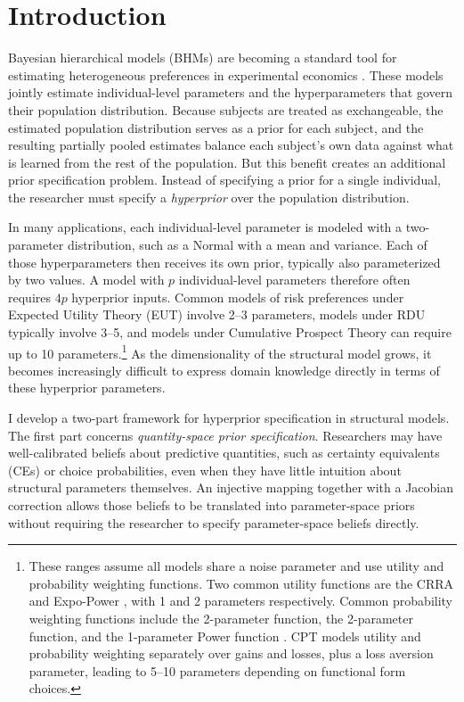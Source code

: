 \documentclass[12pt,a4paper]{article}
\theoremstyle{definition}
\theoremstyle{remark}
\begin{document}
\section{Introduction}
\label{sec:introduction}

Bayesian hierarchical models (BHMs) are becoming a standard tool for estimating heterogeneous preferences in
experimental economics \parencite{Gao2022,Nilsson2011}. These models jointly
estimate individual-level parameters and the hyperparameters that govern their
population distribution. Because subjects are treated as exchangeable, the
estimated population distribution serves as a prior for each subject, and the
resulting partially pooled estimates balance each subject's own data against
what is learned from the rest of the population. But this benefit creates an additional prior
specification problem. Instead of specifying a prior for a single individual,
the researcher must specify a \textit{hyperprior} over the population
distribution.

In many applications, each individual-level parameter is modeled with a
two-parameter distribution, such as a Normal with a mean and variance. Each of
those hyperparameters then receives its own prior, typically also parameterized
by two values. A model with $p$ individual-level parameters therefore often
requires $4p$ hyperprior inputs. Common models of risk preferences under
Expected Utility Theory (EUT) involve 2--3 parameters, models under RDU
typically involve 3--5, and models under Cumulative Prospect Theory
\parencite[CPT;][]{TverskyKahneman1992} can require up to 10
parameters.\footnote{
  These ranges assume all models share a noise parameter and use utility and
  probability weighting functions. Two common utility functions are the CRRA
  and Expo-Power \parencite{Saha1993}, with 1 and 2 parameters respectively.
  Common probability weighting functions include the 2-parameter
  \textcite{Prelec1998} function, the 2-parameter
  \textcite{GoldsteinEinhorn1987} function, and the 1-parameter Power function
  \parencite{Quiggin1982}.
  CPT models utility and probability weighting separately over gains and
  losses, plus a loss aversion parameter, leading to 5--10 parameters depending
  on functional form choices.
} As the dimensionality of the structural model grows, it becomes increasingly
difficult to express domain knowledge directly in terms of these hyperprior
parameters.

I develop a two-part framework for hyperprior specification in
structural models. The first part concerns \textit{quantity-space prior
specification}. Researchers may have well-calibrated beliefs about predictive
quantities, such as certainty equivalents (CEs) or choice probabilities, even
when they have little intuition about structural parameters themselves. An
injective mapping together with a Jacobian correction allows those beliefs to be
translated into parameter-space priors without requiring the researcher to
specify parameter-space beliefs directly.
\end{document}
